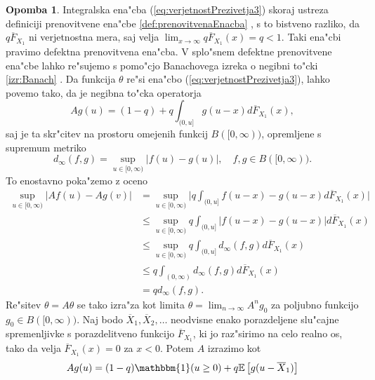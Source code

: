 \documentclass[12pt, a4paper, reqno]{amsart}
\theoremstyle{definition}
\newtheorem{opomba}[definicija]{Opomba}
\theoremstyle{plain}
\newcommand{\E}{\mathbb{E}}
\newcommand{\1}{\mathds{1}}
\newcommand*{\refPriloga}[1]{%
  \begingroup
    \hypersetup{
      linkcolor=red,
      linkbordercolor=red,
    }%
    \ref{#1}%
  \endgroup
}
\begin{document}
    \begin{opomba}
    Integralska ena"cba (\ref{eq:verjetnostPrezivetja3}) skoraj ustreza definiciji prenovitvene ena"cbe
    \refPriloga{def:prenovitvenaEnacba}, s 
    to bistveno razliko, da $q\overline{F}_{X_1}$ ni verjetnostna mera, saj velja 
    $\lim_{x\to\infty}q\overline{F}_{X_1}(x) = q < 1$. Taki ena"cbi pravimo
    defektna prenovitvena ena"cba. V splo"snem defektne prenovitvene ena"cbe lahko re"sujemo s pomo"cjo 
    Banachovega izreka o negibni to"cki \refPriloga{izr:Banach}. Da funkcija $\theta$ re"si ena"cbo 
    (\ref{eq:verjetnostPrezivetja3}), lahko povemo tako, da je negibna to"cka operatorja 
    \begin{equation}
        Ag(u) = (1 - q) + q\int_{(0, u]}g(u - x)d\overline{F}_{X_1}(x),
        \label{eq:operator}
    \end{equation}
    saj je ta skr"citev na prostoru omejenih funkcij $B([0, \infty))$, opremljene s supremum metriko
    \begin{equation*}
        d_\infty(f, g) = \sup_{u\in[0, \infty)}\big|f(u) - g(u)\big|,  \quad f, g\in B([0, \infty)).
    \end{equation*}
    To enostavno poka"zemo z oceno
    \begin{align*}
        \sup_{u\in[0, \infty)}\big|Af(u) - Ag(v)\big| 
                    &= \sup_{u\in[0, \infty)}\bigg|q\int_{(0, u]}f(u- x) - g(u - x)d\overline{F}_{X_1}(x)\bigg| \\
                                &\leq \sup_{u\in[0, \infty)}q\int_{(0, u]}\big|f(u - x) - g(u - x)\big|d\overline{F}_{X_1}(x) \\
                                &\leq \sup_{u\in[0, \infty)}q\int_{(0, u]}d_\infty(f, g)d\overline{F}_{X_1}(x) \\
                                &\leq q\int_{(0, \infty)}d_\infty(f, g)d\overline{F}_{X_1}(x)\\
                                &= qd_\infty(f, g).
    \end{align*}
    Re"sitev $\theta = A\theta$ se tako izra"za kot limita $\theta = \lim_{n\to\infty}A^ng_0$ za 
    poljubno funkcijo $g_0\in B([0, \infty)).$ Naj bodo $\overline{X}_1, \overline{X}_2, \dots $ 
    neodvisne enako porazdeljene slu"cajne spremenljivke s porazdelitveno funkcijo $\overline{F}_{X_1}$, ki 
    jo raz"sirimo na celo realno os, tako da velja $\overline{F}_{X_1}(x) = 0$ za $x < 0$.
    Potem $A$ izrazimo kot
    \begin{equation*}
        Ag(u) = (1 - q)\mathbbm{1}(u\geq0) + q\E\left[g(u - \overline{X}_1)\right]

\end{equation*}
\end{opomba}
\end{document}
